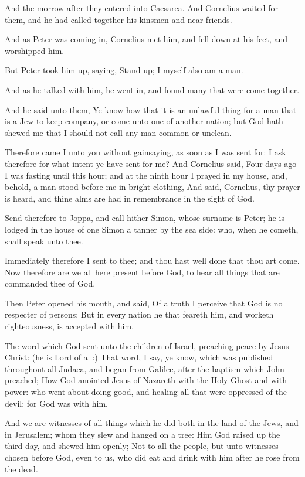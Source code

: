 \verse And the morrow after they entered into Caesarea. And Cornelius waited for them, and he had called together his kinsmen and near friends.

\verse And as Peter was coming in, Cornelius met him, and fell down at his feet, and worshipped him.

\verse But Peter took him up, saying, Stand up; I myself also am a man.

\verse And as he talked with him, he went in, and found many that were come together.

\verse And he said unto them, Ye know how that it is an unlawful thing for a man that is a Jew to keep company, or come unto one of another nation; but God hath shewed me that I should not call any man common or unclean.

\verse Therefore came I unto you without gainsaying, as soon as I was sent for: I ask therefore for what intent ye have sent for me?  \verse And Cornelius said, Four days ago I was fasting until this hour; and at the ninth hour I prayed in my house, and, behold, a man stood before me in bright clothing, \verse And said, Cornelius, thy prayer is heard, and thine alms are had in remembrance in the sight of God.

\verse Send therefore to Joppa, and call hither Simon, whose surname is Peter; he is lodged in the house of one Simon a tanner by the sea side: who, when he cometh, shall speak unto thee.

\verse Immediately therefore I sent to thee; and thou hast well done that thou art come. Now therefore are we all here present before God, to hear all things that are commanded thee of God.

\verse Then Peter opened his mouth, and said, Of a truth I perceive that God is no respecter of persons: \verse But in every nation he that feareth him, and worketh righteousness, is accepted with him.

\verse The word which God sent unto the children of Israel, preaching peace by Jesus Christ: (he is Lord of all:) \verse That word, I say, ye know, which was published throughout all Judaea, and began from Galilee, after the baptism which John preached; \verse How God anointed Jesus of Nazareth with the Holy Ghost and with power: who went about doing good, and healing all that were oppressed of the devil; for God was with him.

\verse And we are witnesses of all things which he did both in the land of the Jews, and in Jerusalem; whom they slew and hanged on a tree: \verse Him God raised up the third day, and shewed him openly; \verse Not to all the people, but unto witnesses chosen before God, even to us, who did eat and drink with him after he rose from the dead.

